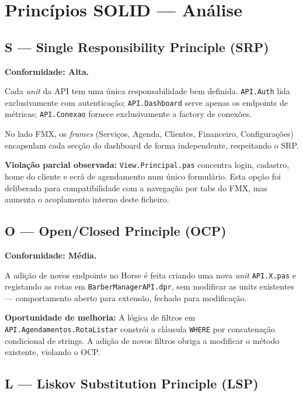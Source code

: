 \documentclass[12pt,a4paper]{article}
\begin{document}
\newpage
\section{Princípios SOLID — Análise}

\subsection{S — Single Responsibility Principle (SRP)}

\textbf{Conformidade: Alta.}

Cada \textit{unit} da API tem uma única responsabilidade bem definida. \texttt{API.Auth} lida exclusivamente com autenticação; \texttt{API.Dashboard} serve apenas os endpoints de métricas; \texttt{API.Conexao} fornece exclusivamente a factory de conexões.

No lado FMX, os \textit{frames} (Serviços, Agenda, Clientes, Financeiro, Configurações) encapsulam cada secção do dashboard de forma independente, respeitando o SRP.

\textbf{Violação parcial observada:} \texttt{View.Principal.pas} concentra login, cadastro, home do cliente e ecrã de agendamento num único formulário. Esta opção foi deliberada para compatibilidade com a navegação por tabs do FMX, mas aumenta o acoplamento interno deste ficheiro.

\subsection{O — Open/Closed Principle (OCP)}

\textbf{Conformidade: Média.}

A adição de novos endpoints no Horse é feita criando uma nova \textit{unit} \texttt{API.X.pas} e registando as rotas em \texttt{BarberManagerAPI.dpr}, sem modificar as units existentes — comportamento aberto para extensão, fechado para modificação.

\textbf{Oportunidade de melhoria:} A lógica de filtros em \texttt{API.Agendamentos.RotaListar} constrói a cláusula \texttt{WHERE} por concatenação condicional de strings. A adição de novos filtros obriga a modificar o método existente, violando o OCP.

\subsection{L — Liskov Substitution Principle (LSP)}
\end{document}
